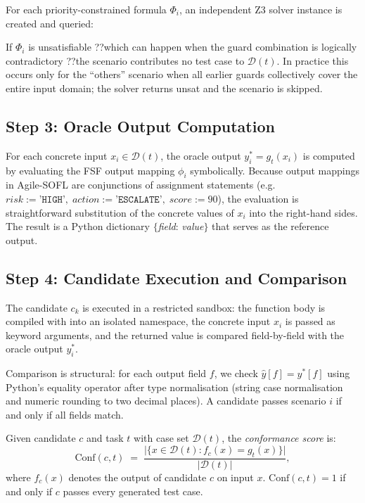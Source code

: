 For each priority-constrained formula $\Phi_i$, an independent Z3 solver
instance is created and queried:


If $\Phi_i$ is unsatisfiable ??which can happen when the guard combination is
logically contradictory ??the scenario contributes no test case to
$\mathcal{D}(t)$.  In practice this occurs only for the ``others'' scenario
when all earlier guards collectively cover the entire input domain; the
solver returns \textsf{unsat} and the scenario is skipped.

\subsection{Step 3: Oracle Output Computation}
\label{subsec:method:oracle-compute}

For each concrete input $x_i \in \mathcal{D}(t)$, the oracle output
$y_i^* = g_t(x_i)$ is computed by evaluating the FSF output mapping
$\phi_i$ symbolically.  Because output mappings in Agile-SOFL are conjunctions
of assignment statements (e.g.\ $\mathit{risk} := \texttt{'HIGH'},\;
\mathit{action} := \texttt{'ESCALATE'},\; \mathit{score} := 90$), the
evaluation is straightforward substitution of the concrete values of
$x_i$ into the right-hand sides.  The result is a Python dictionary
$\{$\textit{field}: \textit{value}$\}$ that serves as the reference output.

\subsection{Step 4: Candidate Execution and Comparison}
\label{subsec:method:exec}

The candidate $c_k$ is executed in a restricted sandbox: the function body is
compiled with  into an isolated namespace, the concrete input
$x_i$ is passed as keyword arguments, and the returned value is compared
field-by-field with the oracle output $y_i^*$.

Comparison is structural: for each output field $f$, we check
$\hat{y}[f] = y^*[f]$ using Python's equality operator after type
normalisation (string case normalisation and numeric rounding to two decimal
places).  A candidate passes scenario $i$ if and only if all fields match.

\begin{definition}
\label{def:conf-score}
Given candidate $c$ and task $t$ with case set $\mathcal{D}(t)$, the
\emph{conformance score} is:
\begin{equation}
  \mathrm{Conf}(c, t) \;=\;
    \frac{\bigl|\{x \in \mathcal{D}(t) : f_c(x) = g_t(x)\}\bigr|}
         {|\mathcal{D}(t)|},
  \label{eq:conf-score}
\end{equation}
where $f_c(x)$ denotes the output of candidate $c$ on input $x$.
$\mathrm{Conf}(c, t) = 1$ if and only if $c$ passes every generated test case.
\end{definition}

